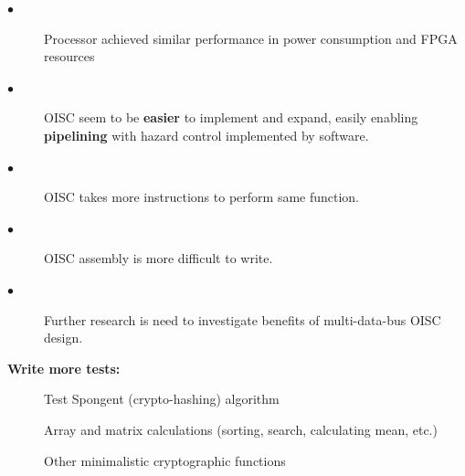 \documentclass[portrait,color=UCLmidgreen,margin=1.5cm,bannerheight=8cm,logoheight=2.5cm]{uclposter}
\begin{document}
\begin{tcolorbox}[title=Results]
%	
\end{tcolorbox}

\begin{Row}\begin{Cell}{1}

\begin{tcolorbox}[title=Conclusion]
	\begin{description}
		\item[$\bullet$] Processor achieved similar performance in power consumption and FPGA resources
		\item[$\bullet$] OISC seem to be \textbf{easier} to implement and expand, easily enabling \textbf{pipelining} with hazard control implemented by software.
		\item[$\bullet$] OISC takes more instructions to perform same function.
		\item[$\bullet$] OISC assembly is more difficult to write.
		\item[$\bullet$] Further research is need to investigate benefits of multi-data-bus OISC design.
		\\[1mm]
	\end{description}
\end{tcolorbox}	

\end{Cell}\begin{Cell}{2}

\begin{tcolorbox}[title=Future work]
	\begin{multicols}{2}
		\textbf{Write more tests:}
		\begin{description}
			\item[\textendash] Test Spongent (crypto-hashing) algorithm
			\item[\textendash] Array and matrix calculations (sorting, search, calculating mean, etc.)
			\item[\textendash] Other minimalistic cryptographic functions
		\end{description}
	

\end{multicols}
\end{tcolorbox}
\end{Cell}
\end{Row}
\end{document}
